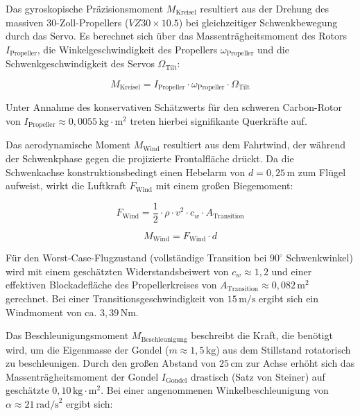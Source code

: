 \noindent
Das gyroskopische Präzisionsmoment $M_{\text{Kreisel}}$ resultiert aus der Drehung des massiven 30-Zoll-Propellers ($VZ30 \times 10.5$) bei gleichzeitiger Schwenkbewegung durch das Servo. Es berechnet sich über das Massenträgheitsmoment des Rotors $I_{\text{Propeller}}$, die Winkelgeschwindigkeit des Propellers $\omega_{\text{Propeller}}$ und die Schwenkgeschwindigkeit des Servos $\Omega_{\text{Tilt}}$:

\begin{equation}
M_{\text{Kreisel}} = I_{\text{Propeller}} \cdot \omega_{\text{Propeller}} \cdot \Omega_{\text{Tilt}}
\end{equation}

\noindent
Unter Annahme des konservativen Schätzwerts für den schweren Carbon-Rotor von $I_{\text{Propeller}} \approx 0,0055\,\text{kg}\cdot\text{m}^2$ treten hierbei signifikante Querkräfte auf.

\noindent
Das aerodynamische Moment $M_{\text{Wind}}$ resultiert aus dem Fahrtwind, der während der Schwenkphase gegen die projizierte Frontalfläche drückt. Da die Schwenkachse konstruktionsbedingt einen Hebelarm von $d = 0,25\,\text{m}$ zum Flügel aufweist, wirkt die Luftkraft $F_{\text{Wind}}$ mit einem großen Biegemoment:

\begin{equation}
F_{\text{Wind}} = \frac{1}{2} \cdot \rho \cdot v^2 \cdot c_w \cdot A_{\text{Transition}}
\end{equation}
 

\begin{equation}
M_{\text{Wind}} = F_{\text{Wind}} \cdot d
\end{equation}

\noindent
Für den Worst-Case-Flugzustand (vollständige Transition bei $90^\circ$ Schwenkwinkel) wird mit einem geschätzten Widerstandsbeiwert von $c_w \approx 1,2$ und einer effektiven Blockadefläche des Propellerkreises von $A_{\text{Transition}} \approx 0,082\,\text{m}^2$ gerechnet. Bei einer Transitionsgeschwindigkeit von $15\,\text{m/s}$ ergibt sich ein Windmoment von ca. $3,39\,\text{Nm}$.

\noindent
Das Beschleunigungsmoment $M_{\text{Beschleunigung}}$ beschreibt die Kraft, die benötigt wird, um die Eigenmasse der Gondel ($m \approx 1,5\,\text{kg}$) aus dem Stillstand rotatorisch zu beschleunigen. Durch den großen Abstand von $25\,\text{cm}$ zur Achse erhöht sich das Massenträgheitsmoment der Gondel $I_{\text{Gondel}}$ drastisch (Satz von Steiner) auf geschätzte $0,10\,\text{kg}\cdot\text{m}^2$. Bei einer angenommenen Winkelbeschleunigung von $\alpha \approx 21\,\text{rad/s}^2$ ergibt sich:

